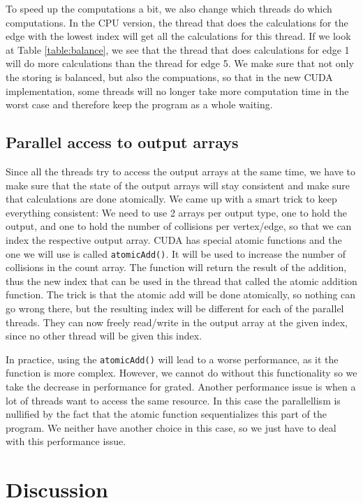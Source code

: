 To speed up the computations a bit, we also change which threads do which computations. In the CPU version, the thread that does the calculations for the edge with the lowest index will get all the calculations for this thread. If we look at Table \ref{table:balance}, we see that the thread that does calculations for edge 1 will do more calculations than the thread for edge 5. We make sure that not only the storing is balanced, but also the compuations, so that in the new CUDA implementation, some threads will no longer take more computation time in the worst case and therefore keep the program as a whole waiting.

\subsection{Parallel access to output arrays}
Since all the threads try to access the output arrays at the same time, we have to make sure that the state of the output arrays will stay consistent and make sure that calculations are done atomically. We came up with a smart trick to keep everything consistent: We need to use 2 arrays per output type, one to hold the output, and one to hold the number of collisions per vertex/edge, so that we can index the respective output array. CUDA has special atomic functions and the one we will use is called \texttt{atomicAdd()}. It will be used to increase the number of collisions in the count array. The function will return the result of the addition, thus the new index that can be used in the thread that called the atomic addition function. The trick is that the atomic add will be done atomically, so nothing can go wrong there, but the resulting index will be different for each of the parallel threads. They can now freely read/write in the output array at the given index, since no other thread will be given this index.

In practice, using the \texttt{atomicAdd()} will lead to a worse performance, as it the function is more complex. However, we cannot do without this functionality so we take the decrease in performance for grated. Another performance issue is when a lot of threads want to access the same resource. In this case the parallellism is nullified by the fact that the atomic function sequentializes this part of the program. We neither have another choice in this case, so we just have to deal with this performance issue. 

\section{Discussion}
